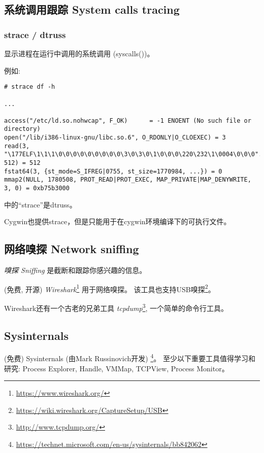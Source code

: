 \documentclass[UTF8,nofonts]{ctexart}
\begin{document}
\subsection{系统调用跟踪 System calls tracing}

\label{strace}
\subsubsection{strace / dtruss}

显示进程在运行中调用的系统调用 (syscalls())。

例如:

\begin{lstlisting}
# strace df -h

...

access("/etc/ld.so.nohwcap", F_OK)      = -1 ENOENT (No such file or directory)
open("/lib/i386-linux-gnu/libc.so.6", O_RDONLY|O_CLOEXEC) = 3
read(3, "\177ELF\1\1\1\0\0\0\0\0\0\0\0\0\3\0\3\0\1\0\0\0\220\232\1\0004\0\0\0"..., 512) = 512
fstat64(3, {st_mode=S_IFREG|0755, st_size=1770984, ...}) = 0
mmap2(NULL, 1780508, PROT_READ|PROT_EXEC, MAP_PRIVATE|MAP_DENYWRITE, 3, 0) = 0xb75b3000
\end{lstlisting}

\myindex{\MacOSX}
\MacOSX 中的``strace''是dtruss。

Cygwin也提供strace，但是只能用于在cygwin环境编译下的可执行文件。

\subsection{网络嗅探 Network sniffing}

\emph{嗅探 Sniffing} 是截断和跟踪你感兴趣的信息。

(免费, 开源) \emph{Wireshark}\footnote{\url{https://www.wireshark.org/}} 用于网络嗅探。
该工具也支持USB嗅探\footnote{\url{https://wiki.wireshark.org/CaptureSetup/USB}}。

Wireshark还有一个古老的兄弟工具 \emph{tcpdump}\footnote{\url{http://www.tcpdump.org/}}, 一个简单的命令行工具。

\subsection{Sysinternals}

(免费) Sysinternals (由Mark Russinovich开发)
\footnote{\url{https://technet.microsoft.com/en-us/sysinternals/bb842062}}。
至少以下重要工具值得学习和研究: Process Explorer, Handle, VMMap, TCPView, Process Monitor。
\end{document}
